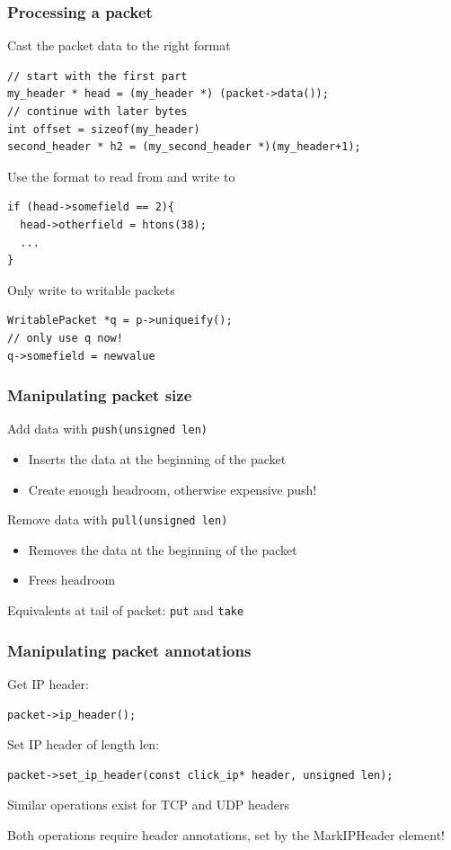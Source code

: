 \documentclass{beamer}
\begin{document}
\begin{frame}
\frametitle{Processing a packet}
Cast the packet data to the right format
\begin{lstlisting}[basicstyle=\footnotesize]
// start with the first part
my_header * head = (my_header *) (packet->data());
// continue with later bytes
int offset = sizeof(my_header)
second_header * h2 = (my_second_header *)(my_header+1);
\end{lstlisting}
Use the format to read from and write to
\begin{lstlisting}[basicstyle=\footnotesize]
if (head->somefield == 2){
  head->otherfield = htons(38);
  ...
}
\end{lstlisting}
\framebreak
Only write to writable packets
\begin{lstlisting}[basicstyle=\footnotesize]
WritablePacket *q = p->uniqueify();
// only use q now!
q->somefield = newvalue
\end{lstlisting}
\end{frame}

\begin{frame}[fragile]
\frametitle{Manipulating packet size}
Add data with \lstinline!push(unsigned len)!
\begin{itemize}
	\item Inserts the data at the beginning of the packet
	\item Create enough headroom, otherwise expensive push!
\end{itemize}
Remove data with \lstinline!pull(unsigned len)!
\begin{itemize}
	\item Removes the data at the beginning of the packet
	\item Frees headroom
\end{itemize}
Equivalents at tail of packet: \lstinline!put! and \lstinline!take!
\end{frame}

\begin{frame}[fragile]
\frametitle{Manipulating packet annotations}
Get IP header:
\begin{lstlisting}[basicstyle=\footnotesize]
packet->ip_header();
\end{lstlisting}
Set IP header of length len:
\begin{lstlisting}[basicstyle=\footnotesize]
packet->set_ip_header(const click_ip* header, unsigned len);
\end{lstlisting}
Similar operations exist for TCP and UDP headers

Both operations require header annotations, set by the MarkIPHeader element!
\end{frame}
\end{document}
